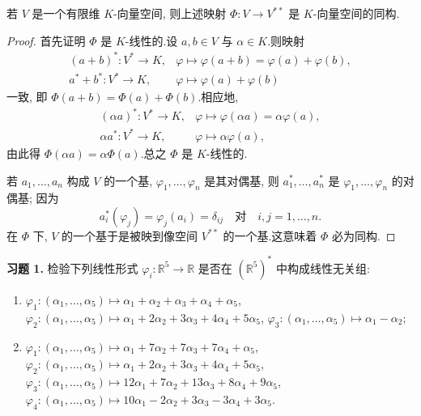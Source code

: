 \begin{theorem}\label{thm:2.3.8}
若 $V$ 是一个有限维 $K$-向量空间, 则上述映射 $\Phi \colon V \longrightarrow V^{**}$ 是 $K$-向量空间的同构.
\end{theorem}

\begin{proof}
首先证明 $\Phi$ 是 $K$-线性的.设 $a, b \in V$ 与 $\alpha \in K$.则映射
\[
\begin{array}{rl}
(a + b)^* \colon V^* \longrightarrow K, & \varphi \longmapsto \varphi(a + b) = \varphi(a) + \varphi(b), \\
a^* + b^* \colon V^* \longrightarrow K, & \varphi \longmapsto \varphi(a) + \varphi(b)
\end{array}
\]
一致, 即 $\Phi(a + b) = \Phi(a) + \Phi(b)$.相应地,
\[
\begin{array}{cc}
(\alpha a)^* \colon V^* \longrightarrow K, & \varphi \longmapsto \varphi(\alpha a) = \alpha\varphi(a), \\
\alpha a^* \colon V^* \longrightarrow K, & \varphi \longmapsto \alpha\varphi(a),
\end{array}
\]
由此得 $\Phi(\alpha a) = \alpha\Phi(a)$.总之 $\Phi$ 是 $K$-线性的.

若 $a_1, \ldots, a_n$ 构成 $V$ 的一个基, $\varphi_1, \ldots, \varphi_n$ 是其对偶基, 则 $a_1^*, \ldots, a_n^*$ 是 $\varphi_1, \ldots, \varphi_n$ 的对偶基; 因为
\[
a_i^*(\varphi_j) = \varphi_j(a_i) = \delta_{ij} \quad \text{对} \quad i, j = 1, \ldots, n\text{.}
\]
在 $\Phi$ 下, $V$ 的一个基于是被映到像空间 $V^{**}$ 的一个基.这意味着 $\Phi$ 必为同构.
\end{proof}

\aufgaben

\noindent\textbf{习题 1.} 检验下列线性形式 $\varphi_i \colon \mathbb{R}^5 \longrightarrow \mathbb{R}$ 是否在 $(\mathbb{R}^5)^*$ 中构成线性无关组:
\begin{enumerate}
\item[(i)] $\varphi_1 \colon (\alpha_1, \ldots, \alpha_5) \longmapsto \alpha_1 + \alpha_2 + \alpha_3 + \alpha_4 + \alpha_5$,
$\varphi_2 \colon (\alpha_1, \ldots, \alpha_5) \longmapsto \alpha_1 + 2\alpha_2 + 3\alpha_3 + 4\alpha_4 + 5\alpha_5$,
$\varphi_3 \colon (\alpha_1, \ldots, \alpha_5) \longmapsto \alpha_1 - \alpha_2$;
\item[(ii)] $\varphi_1 \colon (\alpha_1, \ldots, \alpha_5) \longmapsto \alpha_1 + 7\alpha_2 + 7\alpha_3 + 7\alpha_4 + \alpha_5$,
$\varphi_2 \colon (\alpha_1, \ldots, \alpha_5) \longmapsto \alpha_1 + 2\alpha_2 + 3\alpha_3 + 4\alpha_4 + 5\alpha_5$,
$\varphi_3 \colon (\alpha_1, \ldots, \alpha_5) \longmapsto 12\alpha_1 + 7\alpha_2 + 13\alpha_3 + 8\alpha_4 + 9\alpha_5$,
$\varphi_4 \colon (\alpha_1, \ldots, \alpha_5) \longmapsto 10\alpha_1 - 2\alpha_2 + 3\alpha_3 - 3\alpha_4 + 3\alpha_5$.
\end{enumerate}

